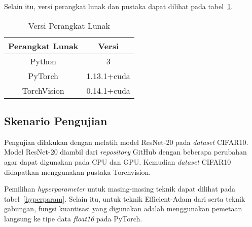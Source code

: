 Selain itu, versi perangkat lunak dan pustaka dapat dilihat pada tabel~\ref{softwares}.
\begin{table}[ht]
  \caption{Versi Perangkat Lunak}\label{softwares}
  \centering
  \begin{tabular}{ | c | c | }
    \hline
    \textbf{Perangkat Lunak} & \textbf{Versi} \\
    \hline
    Python                   & 3              \\
    \hline
    PyTorch                  & 1.13.1+cuda    \\
    \hline
    TorchVision              & 0.14.1+cuda    \\
    \hline
  \end{tabular}
\end{table}

\subsection{Skenario Pengujian}
Pengujian dilakukan dengan melatih model ResNet-20 pada \emph{dataset} CIFAR10. Model ResNet-20 diambil dari \emph{repository} GitHub \cite{Idelbayev18a} dengan beberapa perubahan agar dapat digunakan pada CPU dan GPU. Kemudian \emph{dataset} CIFAR10 didapatkan menggunakan pustaka Torchvision.

Pemilihan \emph{hyperparameter} untuk masing-masing teknik dapat dilihat pada tabel~\ref{hyperparam}. Selain itu, untuk teknik Efficient-Adam dari \textcite{Chen2022Efficient} serta teknik gabungan, fungsi kuantisasi yang digunakan adalah menggunakan pemetaan langsung ke tipe data \emph{float16} pada PyTorch.

